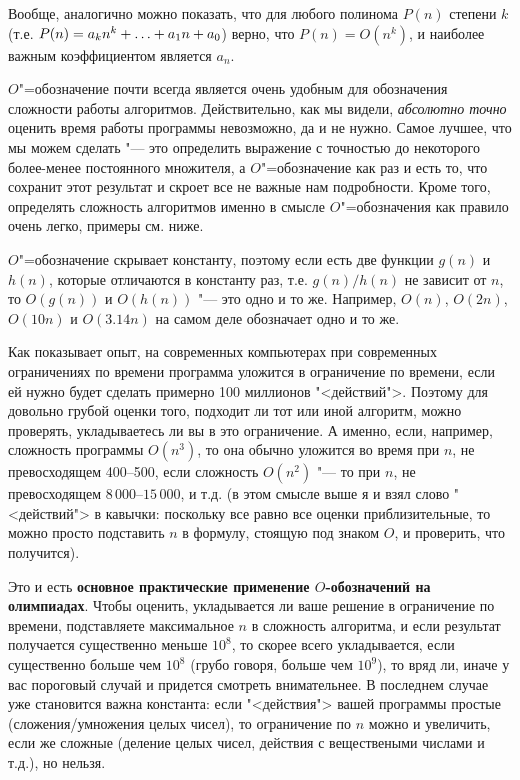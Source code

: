\documentclass[a4paper,10pt]{problems}
\begin{document}
Вообще, аналогично можно показать, что для любого полинома $P(n)$ степени $k$ (т.е. 
$P(n)\hm=a_kn^k\hm+\dots\hm+a_1n+a_0$) верно, что $P(n)=O(n^k)$, и наиболее важным коэффициентом 
является $a_n$.

$O$"=обозначение почти всегда является очень удобным для обозначения сложности работы алгоритмов. 
Действительно, как мы видели, \textit{абсолютно точно} оценить время работы программы 
невозможно, да и не нужно. Самое лучшее, что мы можем сделать "--- это определить выражение с 
точностью до некоторого более-менее постоянного множителя, а $O$"=обозначение как раз и есть 
то, что сохранит этот результат и скроет все не важные нам подробности. Кроме того, определять 
сложность алгоритмов именно в смысле $O$"=обозначения как правило очень легко, примеры см. 
ниже.

$O$"=обозначение скрывает константу, поэтому если есть две функции $g(n)$ и $h(n)$, которые 
отличаются в константу раз, т.е. $g(n)/h(n)$ не зависит от $n$, то $O(g(n))$ и 
$O(h(n))$ "--- это одно и то же. Например, $O(n)$, $O(2n)$, $O(10n)$ и 
$O(3.14n)$ на самом деле обозначает одно и то же.

Как показывает опыт, на 
современных компьютерах при современных ограничениях по времени программа уложится в 
ограничение по времени, если ей нужно будет сделать примерно 100 миллионов "<действий">. 
Поэтому для довольно грубой оценки того, подходит ли тот или иной алгоритм, можно проверять, 
укладываетесь ли вы в это ограничение. А именно, если, например, сложность программы $O(n^3)$, 
то она обычно уложится во время при $n$, не превосходящем 400--500, если сложность $O(n^2)$ 
"--- то при $n$, не превосходящем $8\,000$--$15\,000$, и т.д. (в этом смысле выше я и взял 
слово "<действий"> в кавычки: поскольку все равно все оценки приблизительные, то можно просто 
подставить $n$ в формулу, стоящую под знаком $O$, и проверить, что получится).

Это и есть \textbf{основное практические применение $O$-обозначений на олимпиадах}. Чтобы оценить, 
укладывается ли ваше решение в ограничение по времени, подставляете максимальное $n$ в сложность 
алгоритма, и если результат получается существенно меньше $10^8$, то скорее всего укладывается, если 
существенно больше чем $10^8$ (грубо говоря, больше чем $10^9$), то вряд ли, иначе у вас пороговый 
случай и придется смотреть внимательнее. В последнем случае уже становится важна константа: если 
"<действия"> вашей программы простые (сложения/умножения целых чисел), то ограничение по $n$ можно 
и увеличить, если же сложные (деление целых чисел, действия с веществеными числами и т.д.), но 
нельзя.
\end{document}
